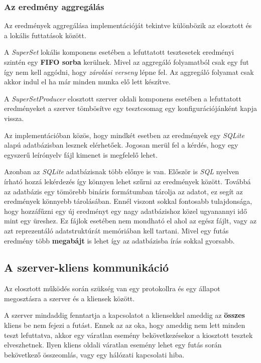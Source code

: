             \pagebreak
        \subsubsection{Az eredmény aggregálás}

            Az eredmények aggregálása implementációját tekintve különbözik az elosztott és a lokális futtatások között.

            A \textit{SuperSet} lokális komponens esetében a lefuttatott tesztesetek eredményi szintén egy \textbf{FIFO
            sorba} kerülnek. Mivel az aggregáló folyamatból csak egy fut így nem kell aggódni, hogy \textit{zárolási
            verseny} lépne fel. Az aggregáló folyamat csak akkor indul el ha már minden munka elő lett készítve.

            A \textit{SuperSetProducer} elosztott szerver oldali komponens esetében a lefuttatott eredményeket a
            szerver tömbösítve egy tesztcsomag egy konfigurációjánként kapja vissza.

            Az implementációban közös, hogy mindkét esetben az eredmények egy \textit{SQLite} alapú adatbázisban
            lesznek elérhetőek. Jogosan merül fel a kérdés, hogy egy egyszerű leírónyelv fájl kimenet is megfelelő
            lehet.

            Azonban az \textit{SQLite} adatbázisnak több előnye is van. Először is \textit{SQL} nyelven írható hozzá
            lekérdezés így könnyen lehet szűrni az eredmények között. Továbbá az adatbázis egy tömörebb bináris
            formátumban tárolja az adatot, ez segít az eredmények könnyebb tárolásában. Ennél viszont sokkal fontosabb
            tulajdonsága, hogy hozzáfűzni egy új eredményt egy nagy adatbázishoz közel ugyanannyi idő mint egy üreshez.
            Ez fájlok esetében nem mondható el ahol az egész fájlt, vagy az azt reprezentáló adatstruktúrát memóriában
            kell tartani. Mivel egy futás eredmény több \textbf{megabájt} is lehet így az adatbázisba írás sokkal
            gyorsabb.

    \subsection{A szerver-kliens kommunikáció}

        Az elosztott működés során szükség van egy protokollra és egy állapot megosztásra a szerver és a kliensek
        között.

        A szerver mindaddig fenntartja a kapcsolatot a kliensekkel ameddig az \textbf{összes} kliens be nem fejezi a
        futást. Ennek az az oka, hogy ameddig nem lett minden teszt lefuttatva, akkor egy váratlan esemény
        bekövetkezésekor a kiosztott tesztek elveszhetnek. Ilyen kliens oldali váratlan esemény lehet egy futás során
        bekövetkező összeomlás, vagy egy hálózati kapcsolati hiba.

